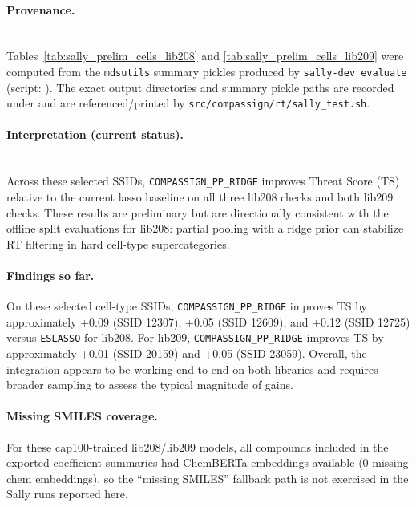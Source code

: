 \documentclass[11pt]{article}
\begin{document}
\paragraph{Provenance.}\mbox{}\\
Tables~\ref{tab:sally_prelim_cells_lib208} and \ref{tab:sally_prelim_cells_lib209} were computed from the \texttt{mdsutils}
summary pickles produced by \texttt{sally-dev evaluate} (script: ).
The exact output directories and summary pickle paths are recorded under  and are
referenced/printed by \nolinkurl{src/compassign/rt/sally_test.sh}.

\paragraph{Interpretation (current status).}\mbox{}\\
Across these selected SSIDs, \nolinkurl{COMPASSIGN_PP_RIDGE} improves Threat Score (TS) relative to the current lasso
baseline on all three lib208 checks and both lib209 checks. These results are preliminary but are directionally
consistent with the offline split evaluations for lib208: partial pooling with a ridge prior can stabilize RT filtering
in hard cell-type supercategories.

\paragraph{Findings so far.}
On these selected cell-type SSIDs, \nolinkurl{COMPASSIGN_PP_RIDGE} improves TS by approximately +0.09 (SSID 12307),
+0.05 (SSID 12609), and +0.12 (SSID 12725) versus \texttt{ESLASSO} for lib208.
For lib209, \nolinkurl{COMPASSIGN_PP_RIDGE} improves TS by approximately +0.01 (SSID 20159) and +0.05 (SSID 23059).
Overall, the integration appears to be working end-to-end on both libraries and requires broader sampling to assess the
typical magnitude of gains.

\paragraph{Missing SMILES coverage.}
For these cap100-trained lib208/lib209 models, all compounds included in the exported coefficient summaries had
ChemBERTa embeddings available (0 missing chem embeddings), so the ``missing SMILES'' fallback path is not exercised in
the Sally runs reported here.
\end{document}
